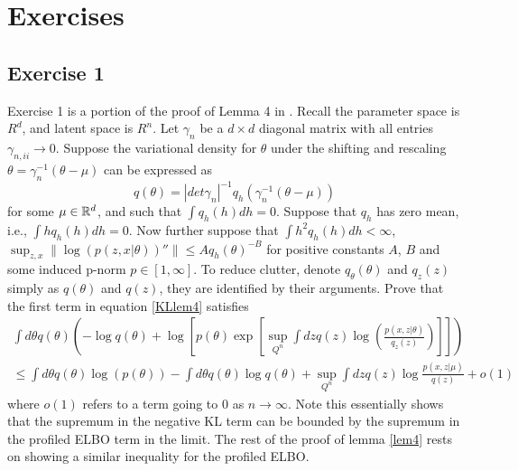 

\section{Exercises}

\subsection{Exercise 1}

Exercise 1 is a portion of the proof of Lemma 4 in \cite{Wang:2019:VBVM}. Recall the parameter space is $R^d$, and latent space is $R^n$. Let $\gamma_n$ be a $d \times d$ diagonal matrix with all entries $\gamma_{n, ii} \to 0$. Suppose the variational density for $\theta$ under the shifting and rescaling $\theta = \gamma_n^{-1}(\theta - \mu)$ can be expressed as
$$
q(\theta) = |det\gamma_n|^{-1}q_h(\gamma_n^{-1}(\theta-\mu))
$$
%
for some $\mu \in \mathbb{R}^d$, and such that $\int q_h(h)dh = 0$. Suppose that $q_h$ has zero mean, i.e., $\int hq_h(h)dh = 0$. Now further suppose that $\int h^2 q_h(h)dh < \infty$, $\sup_{z,x}\|\log(p(z,x|\theta))''\| \leq Aq_h(\theta)^{-B}$ for positive constants $A$, $B$ and some induced p-norm $p \in [1, \infty]$. To reduce clutter, denote $q_{\theta}(\theta)$ and $q_z(z)$ simply as $q(\theta)$ and $q(z)$, they are identified by their arguments. Prove that the first term in equation \ref{KLlem4} satisfies
\begin{gather*}
\int d\theta q(\theta) \left(- \log q(\theta) + \log \left[ p(\theta) \exp \left[ \sup_{Q^n} \int dz q(z) \log\left( \frac{p(x,z|\theta)}{q_z(z)} \right)\right] \right] \right) \\
\leq \int d\theta q(\theta)\log(p(\theta)) - \int d\theta q(\theta)\log q(\theta) +
\sup_{Q^n} \int dz q(z) \log \frac{p(x,z|\mu)}{q(z)} +o(1)
\end{gather*}
where $o(1)$ refers to a term going to $0$ as $n \to \infty$. Note this essentially shows that the supremum in the negative KL term can be bounded by the supremum in the profiled ELBO term in the limit. The rest of the proof of lemma \ref{lem4} rests on showing a similar inequality for the profiled ELBO. 

